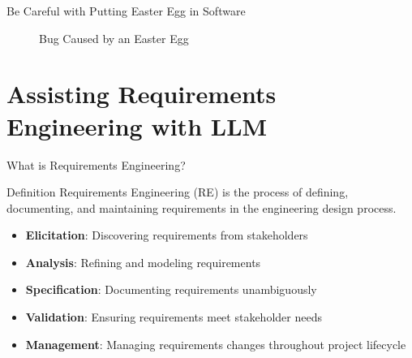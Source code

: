 \documentclass{beamer}
\begin{document}
\begin{frame}{Be Careful with Putting Easter Egg in Software}
        \begin{figure}[b]
        \centering
        \qquad    


        \caption{Bug Caused by an Easter Egg}
        \end{figure}
    
    

    
\end{frame}

\section{Assisting Requirements Engineering with LLM}

\begin{frame}{What is Requirements Engineering?}
    \begin{block}{Definition}
        Requirements Engineering (RE) is the process of defining, documenting, and maintaining requirements in the engineering design process.
    \end{block}
    
    \begin{itemize}
        \item \textbf{Elicitation}: Discovering requirements from stakeholders
        \item \textbf{Analysis}: Refining and modeling requirements
        \item \textbf{Specification}: Documenting requirements unambiguously
        \item \textbf{Validation}: Ensuring requirements meet stakeholder needs
        \item \textbf{Management}: Managing requirements changes throughout project lifecycle
    \end{itemize}
\end{frame}
\end{document}
